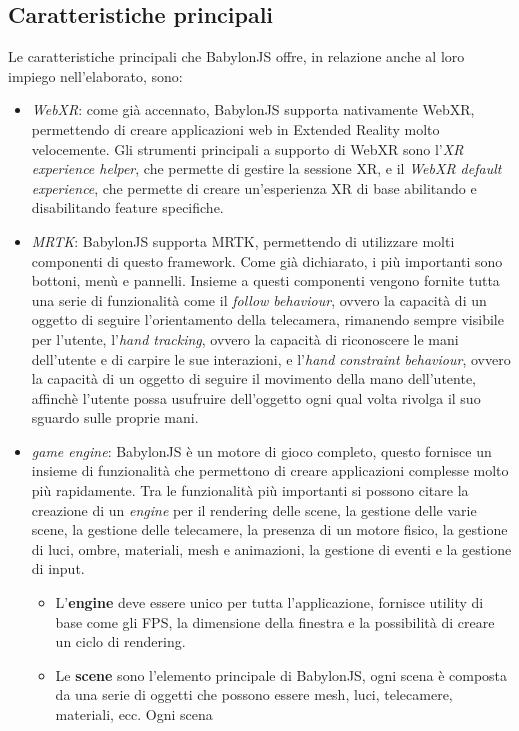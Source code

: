 \subsection{Caratteristiche principali}\label{subsec:BabylonJS_caratteristiche}
Le caratteristiche principali che BabylonJS offre, in relazione anche al loro impiego nell'elaborato, sono:
\begin{itemize}
    \item \textit{WebXR}: come già accennato, BabylonJS supporta nativamente WebXR, permettendo di creare applicazioni web in Extended Reality molto velocemente. Gli strumenti principali
    a supporto di WebXR sono l'\textit{XR experience helper}, che permette di gestire la sessione XR, e il \textit{WebXR default experience}, che permette di creare un'esperienza
    XR di base abilitando e disabilitando feature specifiche.
    \item \textit{MRTK}: BabylonJS supporta MRTK, permettendo di utilizzare molti componenti di questo framework. Come già dichiarato, i più importanti sono
    bottoni, menù e pannelli. Insieme a questi componenti vengono fornite tutta una serie di funzionalità come il \textit{follow behaviour}, ovvero la capacità di un oggetto di 
    seguire l'orientamento della telecamera, rimanendo sempre visibile per l'utente, l'\textit{hand tracking}, ovvero la capacità di riconoscere le mani dell'utente e di 
    carpire le sue interazioni, e l'\textit{hand constraint behaviour}, ovvero la capacità di un oggetto di seguire il movimento della mano dell'utente, affinchè l'utente possa
    usufruire dell'oggetto ogni qual volta rivolga il suo sguardo sulle proprie mani.
    \item \textit{game engine}: BabylonJS è un motore di gioco completo, questo fornisce un insieme di funzionalità che permettono di creare applicazioni complesse molto più rapidamente.
    Tra le funzionalità più importanti si possono citare la creazione di un \textit{engine} per il rendering delle scene, la gestione delle varie scene, la gestione delle telecamere,
    la presenza di un motore fisico, la gestione di luci, ombre, materiali, mesh e animazioni, la gestione di eventi e la gestione di input.
    \begin{itemize}
        \item L'\textbf{engine} deve essere unico per tutta l'applicazione, fornisce utility di base come gli FPS, la dimensione della finestra e la possibilità di creare un ciclo di rendering.
        \item Le \textbf{scene} sono l'elemento principale di BabylonJS, ogni scena è composta da una serie di oggetti che possono essere mesh, luci, telecamere, materiali, ecc. Ogni scena

\end{itemize}
\end{itemize}
